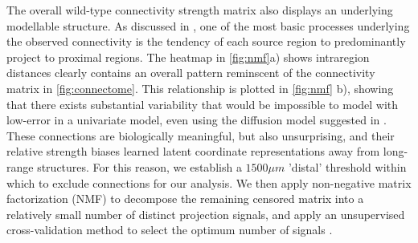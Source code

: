 The overall wild-type connectivity strength matrix also displays an underlying modellable structure.
As discussed in \citet{Knox2019-ot}, one of the most basic processes underlying the observed connectivity is the tendency of each source region to predominantly project to proximal regions.
The heatmap in \ref{fig:nmf}a) shows intraregion distances clearly contains an overall pattern reminscent of the connectivity matrix in \ref{fig:connectome}.
This relationship is plotted in \ref{fig:nmf} b), showing that there exists substantial variability that would be impossible to model with low-error in a univariate model, even using the diffusion model suggested in \citet{Knox2019-ot}.
These connections are biologically meaningful, but also unsurprising, and their relative strength biases learned latent coordinate representations away from long-range structures.
For this reason, we establish a $1500 \mu m$ 'distal' threshold within which to exclude connections for our analysis.
We then apply non-negative matrix factorization (NMF) to decompose the remaining censored matrix into a relatively small number of distinct projection signals, and apply an unsupervised cross-validation method to select the optimum number of signals .



